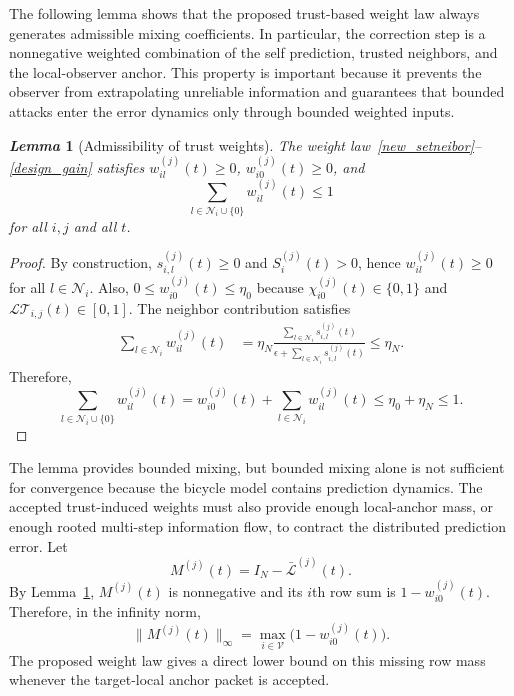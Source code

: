 \documentclass[letterpaper,journal]{IEEEtran}
\def\V{\mathcal{V}} %
\def\L{\mathcal{L}} %
\def\N{\mathcal{N}} %
\def\LT{\mathcal{LT}} %
\newtheorem{lemma}{\it Lemma}%
\begin{document}
The following lemma shows that the proposed trust-based weight law always
generates admissible mixing coefficients. In particular, the correction step
is a nonnegative weighted combination of the self prediction, trusted neighbors,
and the local-observer anchor. This property is important because it prevents
the observer from extrapolating unreliable information and guarantees that
bounded attacks enter the error dynamics only through bounded weighted inputs.

\begin{lemma}[Admissibility of trust weights]\label{lem_weight_admissible}
The weight law~\eqref{new_setneibor}--\eqref{design_gain} satisfies $w_{il}^{(j)}(t)\ge0$, $w_{i0}^{(j)}(t)\ge0$, and
\begin{equation}
\sum_{l\in\N_i\cup\{0\}}w_{il}^{(j)}(t)\le1
\end{equation}
for all $i,j$ and all $t$.
\end{lemma}
\begin{proof}
By construction, $s_{i,l}^{(j)}(t)\ge0$ and $S_i^{(j)}(t)>0$, hence $w_{il}^{(j)}(t)\ge0$ for all $l\in\N_i$. Also, $0\le w_{i0}^{(j)}(t)\le \eta_0$ because $\chi_{i0}^{(j)}(t)\in\{0,1\}$ and $\LT_{i,j}(t)\in[0,1]$. The neighbor contribution satisfies
\begin{align*}
\sum_{l\in\N_i}w_{il}^{(j)}(t)
&=
\eta_N
\frac{\sum_{l\in\N_i}s_{i,l}^{(j)}(t)}
{\epsilon+\sum_{l\in\N_i}s_{i,l}^{(j)}(t)}
\le \eta_N .
\end{align*}
Therefore,
\[
\sum_{l\in\N_i\cup\{0\}}w_{il}^{(j)}(t)
=w_{i0}^{(j)}(t)+\sum_{l\in\N_i}w_{il}^{(j)}(t)
\le \eta_0+\eta_N\le1 .
\]
\end{proof}

The lemma provides bounded mixing, but bounded mixing alone is not sufficient for convergence because the bicycle model contains prediction dynamics. The accepted trust-induced weights must also provide enough local-anchor mass, or enough rooted multi-step information flow, to contract the distributed prediction error. Let
\begin{equation}
    M^{(j)}(t)=I_N-\bar{\L}^{(j)}(t).
\end{equation}
By Lemma~\ref{lem_weight_admissible}, $M^{(j)}(t)$ is nonnegative and its $i$th row sum is $1-w_{i0}^{(j)}(t)$. Therefore, in the infinity norm,
\begin{equation}
    \|M^{(j)}(t)\|_{\infty}
    =
    \max_{i\in\V}\big(1-w_{i0}^{(j)}(t)\big).
    \label{eq_M_inf_norm}
\end{equation}
The proposed weight law gives a direct lower bound on this missing row mass whenever the target-local anchor packet is accepted.
\end{document}
